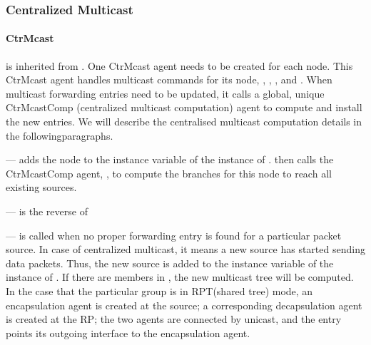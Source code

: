 \subsubsection{Centralized Multicast}
\begin{list}{}{}
\item
\paragraph{CtrMcast}
 is inherited from .
One CtrMcast agent needs to be created for each node.
This CtrMcast agent handles multicast commands for its node,
\eg, , 
, and .
When multicast forwarding entries need to be updated, it calls a 
global, unique CtrMcastComp
(centralized multicast computation) agent to compute and install the new
entries.
We will describe the centralised multicast computation details
in the followingparagraphs.

--- 
 adds the node to the instance variable
 of the instance of .
then calls the CtrMcastComp agent, , to compute the branches
for this node to reach all existing sources.

---
 is the reverse of 

---
 is called when no proper forwarding entry is
found for a particular packet source.
In case of centralized multicast,
it means a new source has started sending data packets.
Thus, the new source is added to the instance variable 
of the instance of .
If there are members in ,
the new multicast tree will be computed.
In the case that the particular
group is in RPT(shared tree) mode, an encapsulation agent is created at the
source; 
a corresponding decapsulation agent is created at the RP;
the two agents are connected by unicast, and the  entry points
its outgoing interface to the encapsulation agent.
\item

\end{list}
